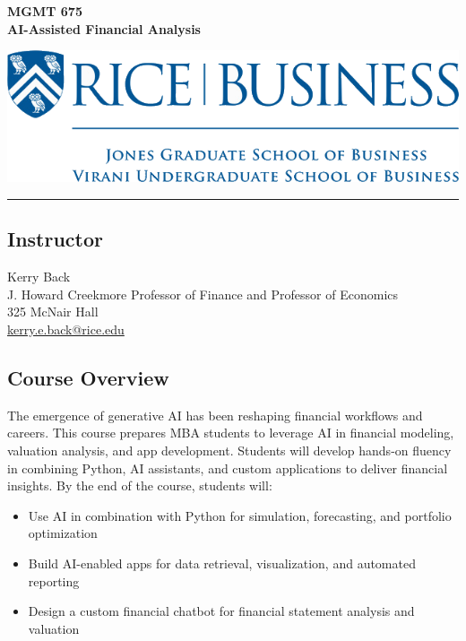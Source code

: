 \documentclass[11pt]{article}
\begin{document}
\begin{minipage}[c][3cm][c]{0.5\textwidth}
\Large\textbf{MGMT 675\\ AI-Assisted Financial Analysis}
\end{minipage}
\hfill
\begin{minipage}[c][3cm][c]{0.4\textwidth}
\includegraphics[width=\textwidth]{images/rice-business-transparent-final.png}
\end{minipage}

\vspace{1cm}
\hrule
\subsection*{Instructor}
Kerry Back\\
J. Howard Creekmore Professor of Finance and Professor of Economics\\
325 McNair Hall\\
\href{mailto:kerry.e.back@rice.edu}{kerry.e.back@rice.edu}

\subsection*{Course Overview}

The emergence of generative AI has been reshaping financial workflows and careers. This course prepares MBA students to leverage AI in financial modeling, valuation analysis, and app development. Students will develop hands-on fluency in combining Python, AI assistants, and custom applications to deliver financial insights.  By the end of the course, students will:

\begin{itemize}\setlength{\itemsep}{0pt}
\item Use AI in combination with Python for simulation, forecasting, and portfolio optimization
\item Build AI-enabled apps for data retrieval, visualization, and automated reporting
\item Design a custom financial chatbot for financial statement analysis and valuation
\end{itemize}
\end{document}
